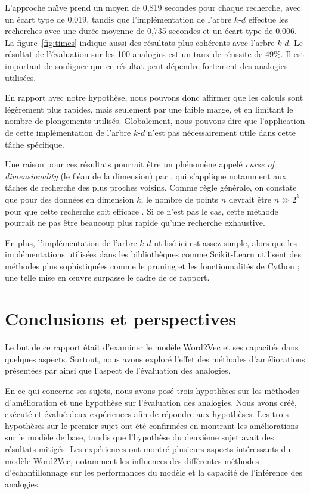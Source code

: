 \documentclass[12pt]{article}
\begin{document}
L'approche na\"\i ve prend un moyen de 0{,}819 secondes pour chaque recherche, avec un écart type de 0{,}019, tandis que l'implémentation de l'arbre $k$-$d$ effectue les recherches avec une durée moyenne de 0{,}735 secondes et un écart type de 0{,}006. La figure~\ref{fig:times} indique aussi des résultats plus cohérents avec l'arbre $k$-$d$. Le résultat de l'évaluation sur les 100 analogies est un taux de réussite de 49\%. Il est important de souligner que ce résultat peut dépendre fortement des analogies utilisées.

En rapport avec notre hypothèse, nous pouvons donc affirmer que les calculs sont légèrement plus rapides, mais seulement par une faible marge, et en limitant le nombre de plongements utilisés. Globalement, nous pouvons dire que l'application de cette implémentation de l'arbre $k$-$d$ n'est pas nécessairement utile dans cette tâche spécifique.

Une raison pour ces résultats pourrait être un phénomène appelé \textit{curse of dimensionality} (le fléau de la dimension) par \cite{Freimer1961AdaptiveCP}, qui s'applique notamment aux tâches de recherche des plus proches voisins. Comme règle générale, on constate que pour des données en dimension $ k $, le nombre de points $ n $ devrait être $ n \gg 2^k $ pour que cette recherche soit efficace \citep{indyk2004nearest}. Si ce n'est pas le cas, cette méthode pourrait ne pas être beaucoup plus rapide qu'une recherche exhaustive.

En plus, l'implémentation de l'arbre $k$-$d$ utilisé ici est assez simple, alors que les implémentations utilisées dans les bibliothèques comme Scikit-Learn utilisent des méthodes plus sophistiquées comme le pruning et les fonctionnalités de Cython \citep{behnel2011cython} ; une telle mise en œuvre surpasse le cadre de ce rapport. 

\section{Conclusions et perspectives} \label{conclusions et perspectives}

Le but de ce rapport était d'examiner le modèle Word2Vec et ses capacités dans quelques aspects. Surtout, nous avons exploré l'effet des méthodes d'améliorations présentées par \cite{DBLP:conf/nips/MikolovSCCD13} ainsi que l'aspect de l'évaluation des analogies.

En ce qui concerne ses sujets, nous avons posé trois hypothèses sur les méthodes d'amélioration et une hypothèse sur l'évaluation des analogies. Nous avons créé, exécuté et évalué deux expériences afin de répondre aux hypothèses. Les trois hypothèses sur le premier sujet ont été confirmées en montrant les améliorations sur le modèle de base, tandis que l'hypothèse du deuxième sujet avait des résultats mitigés. Les expériences ont montré plusieurs aspects intéressants du modèle Word2Vec, notamment les influences des différentes méthodes d'échantillonnage sur les performances du modèle et la capacité de l'inférence des analogies. 
\end{document}
